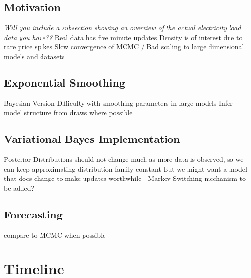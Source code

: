 \documentclass{article}\usepackage[]{graphicx}\usepackage[]{color}
\numberwithin{equation}{section}
\begin{document}
\subsection{Motivation}
\emph{Will you include a subsection showing an overview of the actual electricity load data you have??}
Real data has five minute updates
Density is of interest due to rare price spikes
Slow convergence of MCMC / Bad scaling to large dimensional models and datasets
\subsection{Exponential Smoothing}
Bayesian Version
Difficulty with smoothing parameters in large models
Infer model structure from draws where possible
\subsection{Variational Bayes Implementation}
Posterior Distributions should not change much as more data is observed, so we can keep approximating distribution family constant
But we might want a model that does change to make updates worthwhile - Markov Switching mechanism to be added?
\subsection{Forecasting}
compare to MCMC when possible

\section{Timeline}



\end{document}
